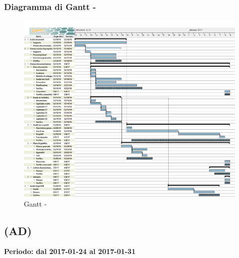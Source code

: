 \documentclass[./PianoDiProgetto.tex]{subfiles}
\begin{document}
  \subsubsection{Diagramma di Gantt - \PerAR}
    \begin{figure}[!h]
    \centering
    \includegraphics[width=\textwidth]{images/AR}
    \caption{Gantt - \PerAR}
    \end{figure}

	\subsection{\PerAD{} (AD)}
  \textbf{Periodo: dal 2017-01-24 al 2017-01-31}
\end{document}

